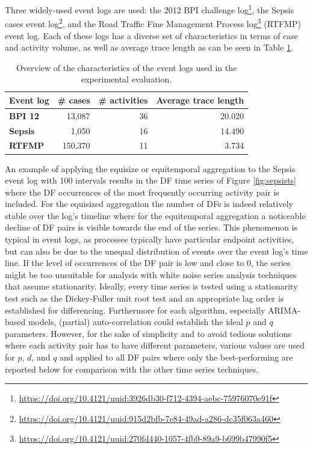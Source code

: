 Three widely-used event logs are used: the 2012 BPI challenge log\footnote{\url{https://doi.org/10.4121/uuid:3926db30-f712-4394-aebc-75976070e91f}}, the Sepsis cases event log\footnote{\url{https://doi.org/10.4121/uuid:915d2bfb-7e84-49ad-a286-dc35f063a460}}, and the Road Traffic Fine Management Process log\footnote{\url{https://doi.org/10.4121/uuid:270fd440-1057-4fb9-89a9-b699b47990f5}} (RTFMP) event log.
Each of these logs has a diverse set of characteristics in terms of case and activity volume, as well as average trace length as can be seen in Table \ref{tab:eventlogs}.
\begin{table}[htbp]
  \centering
    \begin{tabular}{lrrr}
    \toprule
    \textbf{Event log} & \multicolumn{1}{l}{\textbf{\# cases}} & \multicolumn{1}{l}{\textbf{\# activities}} & \multicolumn{1}{l}{\textbf{Average trace length}} \\
    \midrule
    \textbf{BPI 12} & 13,087 & 36    & 20.020 \\
    \textbf{Sepsis} & 1,050 & 16    & 14.490 \\
    \textbf{RTFMP} & 150,370 & 11    & 3.734 \\
    \bottomrule
    \end{tabular}%
  \caption{Overview of the characteristics of the event logs used in the experimental evaluation.}
  \label{tab:eventlogs}%
\end{table}%

An example of applying the equisize or equitemporal aggregation to the Sepsis event log with 100 intervals results in the DF time series of Figure \ref{fig:sepsists} where the DF occurrences of the most frequently occurring activity pair is included.
For the equisized aggregation the number of DFs is indeed relatively stable over the log's timeline where for the equitemporal aggregation a noticeable decline of DF pairs is visible towards the end of the series.
This phenomenon is typical in event logs, as processes typically have particular endpoint activities, but can also be due to the unequal distribution of events over the event log's time line.
If the level of occurrences of the DF pair is low and close to 0, the series might be too unsuitable for analysis with white noise series analysis techniques that assume stationarity.
Ideally, every time series is tested using a stationarity test such as the Dickey-Fuller unit root test \cite{leybourne1995testing} and an appropriate lag order is established for differencing. 
Furthermore for each algorithm, especially ARIMA-based models, (partial) auto-correlation could establish the ideal $p$ and $q$ parameters.
However, for the sake of simplicity and to avoid tedious solutions where each activity pair has to have different parameters, various values are used for $p$, $d$, and $q$ and applied to all DF pairs where only the best-performing are reported below for comparison with the other time series techniques.

